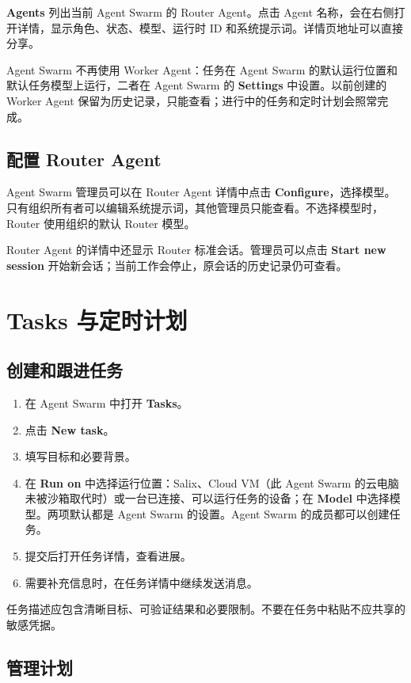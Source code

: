 \documentclass[UTF8,a4paper,11pt]{ctexart}
\begin{document}
\textbf{Agents} 列出当前 Agent Swarm 的 Router Agent。点击 Agent 名称，会在右侧打开详情，显示角色、状态、模型、运行时 ID 和系统提示词。详情页地址可以直接分享。

Agent Swarm 不再使用 Worker Agent：任务在 Agent Swarm 的默认运行位置和默认任务模型上运行，二者在 Agent Swarm 的 \textbf{Settings} 中设置。以前创建的 Worker Agent 保留为历史记录，只能查看；进行中的任务和定时计划会照常完成。

\subsection{配置 Router Agent}

Agent Swarm 管理员可以在 Router Agent 详情中点击 \textbf{Configure}，选择模型。只有组织所有者可以编辑系统提示词，其他管理员只能查看。不选择模型时，Router 使用组织的默认 Router 模型。

Router Agent 的详情中还显示 Router 标准会话。管理员可以点击 \textbf{Start new session} 开始新会话；当前工作会停止，原会话的历史记录仍可查看。

\section{Tasks 与定时计划}

\subsection{创建和跟进任务}

\begin{enumerate}
  \item 在 Agent Swarm 中打开 \textbf{Tasks}。
  \item 点击 \textbf{New task}。
  \item 填写目标和必要背景。
  \item 在 \textbf{Run on} 中选择运行位置：Salix、Cloud VM（此 Agent Swarm 的云电脑未被沙箱取代时）或一台已连接、可以运行任务的设备；在 \textbf{Model} 中选择模型。两项默认都是 Agent Swarm 的设置。Agent Swarm 的成员都可以创建任务。
  \item 提交后打开任务详情，查看进展。
  \item 需要补充信息时，在任务详情中继续发送消息。
\end{enumerate}

任务描述应包含清晰目标、可验证结果和必要限制。不要在任务中粘贴不应共享的敏感凭据。

\subsection{管理计划}
\end{document}
